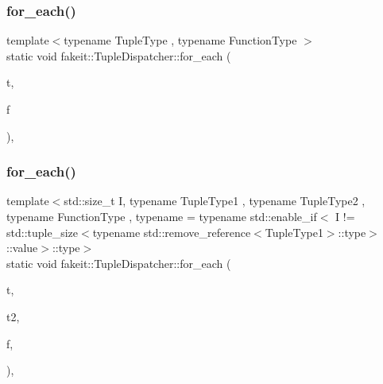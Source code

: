 \mbox{\label{structfakeit_1_1TupleDispatcher_a8fd292a71795aae0aba215dad28ee4c2}} 
\subsubsection{\texorpdfstring{for\_each()}{for\_each()}\hspace{0.1cm}{\footnotesize\ttfamily [16/54]}}
{\footnotesize\ttfamily template$<$typename Tuple\+Type , typename Function\+Type $>$ \\
static void fakeit\+::\+Tuple\+Dispatcher\+::for\+\_\+each (\begin{DoxyParamCaption}\item[{Tuple\+Type \&\&}]{t,  }\item[{Function\+Type \&}]{f }\end{DoxyParamCaption})\hspace{0.3cm}{\ttfamily [inline]}, {\ttfamily [static]}}

\mbox{\label{structfakeit_1_1TupleDispatcher_a42566b7faaac776dc99492e7c0b973b3}} 
\subsubsection{\texorpdfstring{for\_each()}{for\_each()}\hspace{0.1cm}{\footnotesize\ttfamily [17/54]}}
{\footnotesize\ttfamily template$<$std\+::size\+\_\+t I, typename Tuple\+Type1 , typename Tuple\+Type2 , typename Function\+Type , typename  = typename std\+::enable\+\_\+if$<$            I != std\+::tuple\+\_\+size$<$typename std\+::remove\+\_\+reference$<$\+Tuple\+Type1$>$\+::type$>$\+::value$>$\+::type$>$ \\
static void fakeit\+::\+Tuple\+Dispatcher\+::for\+\_\+each (\begin{DoxyParamCaption}\item[{Tuple\+Type1 \&\&}]{t,  }\item[{Tuple\+Type2 \&\&}]{t2,  }\item[{Function\+Type \&}]{f,  }\item[{std\+::integral\+\_\+constant$<$ size\+\_\+t, I $>$}]{ }\end{DoxyParamCaption})\hspace{0.3cm}{\ttfamily [inline]}, {\ttfamily [static]}}

